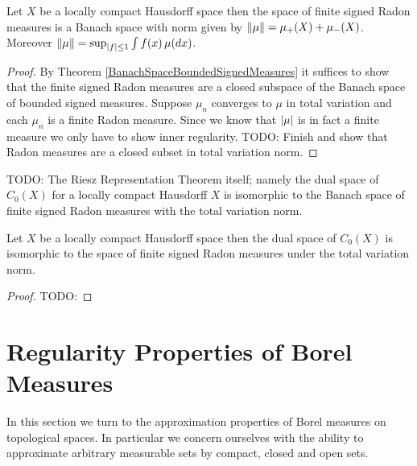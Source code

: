 \begin{thm}\label{BanachSpaceRadonMeasuresLCH}Let $X$ be a locally compact Hausdorff space then the space
  of finite signed Radon measures is a Banach space with norm given by
  $\left \lVert \mu \right \rVert = \mu_+(X) + \mu_-(X)$.  Moreover $\left \lVert \mu \right \rVert = \sup_{\left \vert f \right \vert \leq 1} \int f (x) \, \mu(dx)$.
\end{thm}
\begin{proof}
By Theorem \ref{BanachSpaceBoundedSignedMeasures} it suffices to show that the finite signed Radon measures are a closed subspace of the 
Banach space of bounded signed measures.
Suppose $\mu_n$ converges to $\mu$ in total variation and each $\mu_n$ is a finite Radon measure.  Since we know that $\left \vert \mu \right \vert$ is in fact a finite measure we only have to show inner regularity.
TODO: Finish and show that Radon measures are a closed subset in total variation norm.
\end{proof}

TODO: The Riesz Representation Theorem itself; namely the dual space of $C_0(X)$ for a locally compact Hausdorff $X$ is 
isomorphic to the Banach space of finite signed Radon measures with
the total variation norm.
\begin{thm}\label{RieszRepresentationLCH}Let $X$ be a locally compact
  Hausdorff space then the dual space of $C_0(X)$ is isomorphic to the
  space of finite signed Radon measures under the total variation norm.
\end{thm}
\begin{proof}
TODO:
\end{proof}

\section{Regularity Properties of Borel Measures}

In this section we turn to the approximation properties of Borel measures on topological spaces.  In particular we
concern ourselves with the ability to approximate arbitrary measurable sets by compact, closed and open sets.

